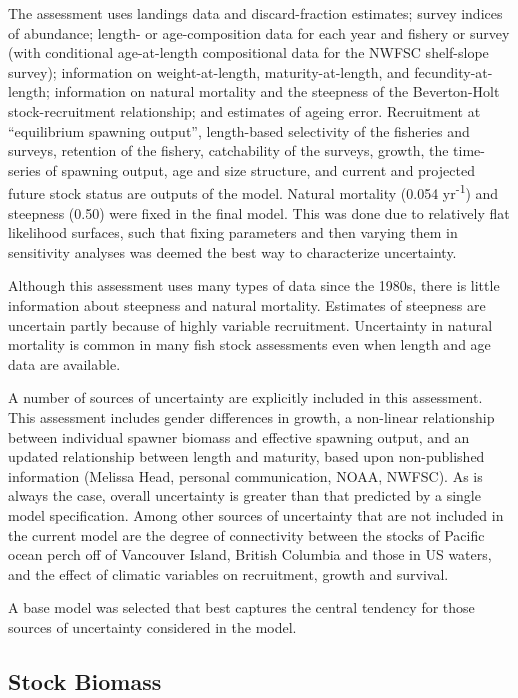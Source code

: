 \documentclass[12pt,]{article}
\begin{document}
The assessment uses landings data and discard-fraction estimates; survey
indices of abundance; length- or age-composition data for each year and
fishery or survey (with conditional age-at-length compositional data for
the NWFSC shelf-slope survey); information on weight-at-length,
maturity-at-length, and fecundity-at-length; information on natural
mortality and the steepness of the Beverton-Holt stock-recruitment
relationship; and estimates of ageing error. Recruitment at
``equilibrium spawning output'', length-based selectivity of the
fisheries and surveys, retention of the fishery, catchability of the
surveys, growth, the time-series of spawning output, age and size
structure, and current and projected future stock status are outputs of
the model. Natural mortality (0.054 yr\textsuperscript{-1}) and
steepness (0.50) were fixed in the final model. This was done due to
relatively flat likelihood surfaces, such that fixing parameters and
then varying them in sensitivity analyses was deemed the best way to
characterize uncertainty.

Although this assessment uses many types of data since the 1980s, there
is little information about steepness and natural mortality. Estimates
of steepness are uncertain partly because of highly variable
recruitment. Uncertainty in natural mortality is common in many fish
stock assessments even when length and age data are available.

A number of sources of uncertainty are explicitly included in this
assessment. This assessment includes gender differences in growth, a
non-linear relationship between individual spawner biomass and effective
spawning output, and an updated relationship between length and
maturity, based upon non-published information (Melissa Head, personal
communication, NOAA, NWFSC). As is always the case, overall uncertainty
is greater than that predicted by a single model specification. Among
other sources of uncertainty that are not included in the current model
are the degree of connectivity between the stocks of Pacific ocean perch
off of Vancouver Island, British Columbia and those in US waters, and
the effect of climatic variables on recruitment, growth and survival.

A base model was selected that best captures the central tendency for
those sources of uncertainty considered in the model.

\subsection*{Stock Biomass}\label{stock-biomass}
\end{document}
